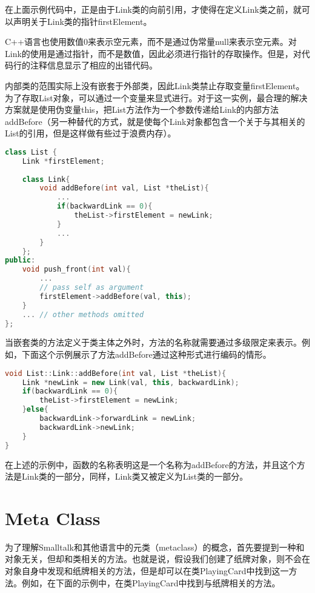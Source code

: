 在上面示例代码中，正是由于Link类的向前引用，才使得在定义Link类之前，就可以声明关于Link类的指针firstElement。

C++语言也使用数值0来表示空元素，而不是通过伪常量null来表示空元素。对Link的使用是通过指针，而不是数值，因此必须进行指针的存取操作。但是，对代码行的注释信息显示了相应的出错代码。

内部类的范围实际上没有嵌套于外部类，因此Link类禁止存取变量firstElement。为了存取List对象，可以通过一个变量来显式进行。对于这一实例，最合理的解决方案就是使用伪变量this，把List方法作为一个参数传递给Link的内部方法addBefore（另一种替代的方式，就是使每个Link对象都包含一个关于与其相关的List的引用，但是这样做有些过于浪费内存）。



\begin{lstlisting}[language=C++]
class List {
	Link *firstElement;
	
	class Link{
		void addBefore(int val, List *theList){
			...
			if(backwardLink == 0){
				theList->firstElement = newLink;
			}
			...
		}
	};
public:
	void push_front(int val){
		...
		// pass self as argument
		firstElement->addBefore(val, this);
	}
	... // other methods omitted
};
\end{lstlisting}

当嵌套类的方法定义于类主体之外时，方法的名称就需要通过多级限定来表示。例如，下面这个示例展示了方法addBefore通过这种形式进行编码的情形。



\begin{lstlisting}[language=C++]
void List::Link::addBefore(int val, List *theList){
	Link *newLink = new Link(val, this, backwardLink);
	if(backwardLink == 0){
		theList->firstElement = newLink;
	}else{
		backwardLink->forwardLink = newLink;
		backwardLink->newLink;
	}
}
\end{lstlisting}

在上述的示例中，函数的名称表明这是一个名称为addBefore的方法，并且这个方法是Link类的一部分，同样，Link类又被定义为List类的一部分。

\section{Meta Class}


为了理解Smalltalk和其他语言中的元类（metaclass）的概念，首先要提到一种和对象无关，但却和类相关的方法。也就是说，假设我们创建了纸牌对象，则不会在对象自身中发现和纸牌相关的方法，但是却可以在类PlayingCard中找到这一方法。例如，在下面的示例中，在类PlayingCard中找到与纸牌相关的方法。

